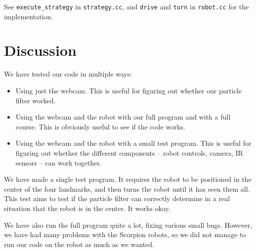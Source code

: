 \documentclass[a4paper,12pt]{article}
\begin{document}
See \texttt{execute_strategy} in \texttt{strategy.cc}, and \texttt{drive} and
\texttt{turn} in \texttt{robot.cc} for the implementation.


\newpage
\section{Discussion}

We have tested our code in multiple ways:

\begin{itemize}
\item Using just the webcam.  This is useful for figuring out whether our
particle filter worked.
\item Using the webcam and the robot with our full program and with a full
course.  This is obviously useful to see if the code works.
\item Using the webcam and the robot with a small test program.  This is useful
for figuring out whether the different components -- robot controls, camera, IR
sensors -- can work together.
\end{itemize}

We have made a single test program.  It requires the robot to be positioned in
the center of the four landmarks, and then turns the robot until it has seen
them all.  This test aims to test if the particle filter can correctly determine
in a real situation that the robot is in the center.  It works okay.

We have also run the full program quite a lot, fixing various small bugs.
However, we have had many problems with the Scorpion robots, so we did not
manage to run our code on the robot as much as we wanted.
\end{document}
